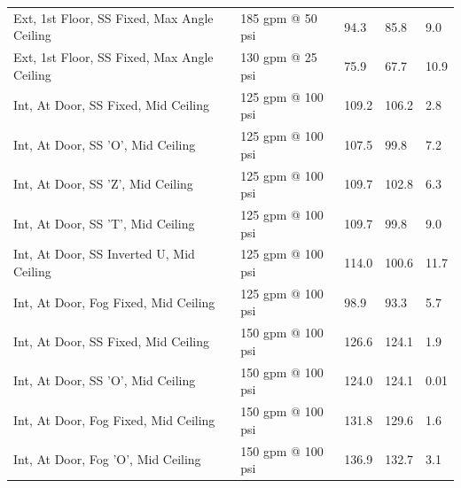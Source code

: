 \documentclass[12pt,oneside]{book}
\begin{document}
\begin{table}[!ht]
\begin{tabular}{lllll}
Ext, 1st Floor, SS Fixed, Max Angle Ceiling           & 185 gpm @ 50 psi               &  94.3                             & 85.8                               & 9.0                    \\
Ext, 1st Floor, SS Fixed, Max Angle Ceiling           & 130 gpm @ 25 psi               &  75.9                             & 67.7                               & 10.9                   \\
Int, At Door, SS Fixed, Mid Ceiling                   & 125 gpm @ 100 psi              & 109.2                             & 106.2                              & 2.8                    \\
Int, At Door, SS 'O', Mid Ceiling                     & 125 gpm @ 100 psi              & 107.5                             & 99.8                               & 7.2                    \\
Int, At Door, SS 'Z', Mid Ceiling                     & 125 gpm @ 100 psi              & 109.7                             & 102.8                              & 6.3                    \\
Int, At Door, SS 'T', Mid Ceiling                     & 125 gpm @ 100 psi              & 109.7                             & 99.8                               & 9.0                    \\
Int, At Door, SS Inverted U, Mid Ceiling              & 125 gpm @ 100 psi              & 114.0                             & 100.6                              & 11.7                   \\
Int, At Door, Fog Fixed, Mid Ceiling                  & 125 gpm @ 100 psi              &  98.9                             & 93.3                               & 5.7                    \\
Int, At Door, SS Fixed, Mid Ceiling                   & 150 gpm @ 100 psi              & 126.6                             & 124.1                              & 1.9                    \\
Int, At Door, SS 'O', Mid Ceiling                     & 150 gpm @ 100 psi              & 124.0                             & 124.1                              & 0.01                   \\
Int, At Door, Fog Fixed, Mid Ceiling                  & 150 gpm @ 100 psi              & 131.8                             & 129.6                              & 1.6                    \\
Int, At Door, Fog 'O', Mid Ceiling                    & 150 gpm @ 100 psi              & 136.9                             & 132.7                              & 3.1                    \\

\end{tabular}
\end{table}
\end{document}
